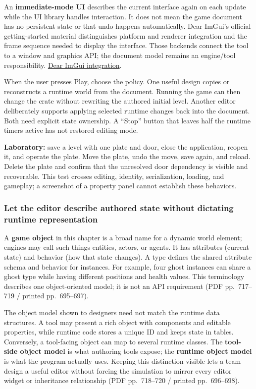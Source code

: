 An \textbf{immediate-mode UI} describes the current interface again on each update while the UI library handles interaction. It does not mean the game document has no persistent state or that undo happens automatically. Dear ImGui's official getting-started material distinguishes platform and renderer integration and the frame sequence needed to display the interface. Those backends connect the tool to a window and graphics API; the document model remains an engine/tool responsibility. \href{https://github.com/ocornut/imgui/wiki/Getting-Started}{Dear ImGui integration}.

When the user presses Play, choose the policy. One useful design copies or reconstructs a runtime world from the document. Running the game can then change the crate without rewriting the authored initial level. Another editor deliberately supports applying selected runtime changes back into the document. Both need explicit state ownership. A ``Stop'' button that leaves half the runtime timers active has not restored editing mode.

\textbf{Laboratory:} save a level with one plate and door, close the application, reopen it, and operate the plate. Move the plate, undo the move, save again, and reload. Delete the plate and confirm that the unresolved door dependency is visible and recoverable. This test crosses editing, identity, serialization, loading, and gameplay; a screenshot of a property panel cannot establish these behaviors.

\subsubsection{Let the editor describe authored state without dictating runtime representation}\label{06-engine-ii-ch032-let-the-editor-describe-authored-state-without-dictating-runtime-representation}

A \textbf{game object} in this chapter is a broad name for a dynamic world element; engines may call such things entities, actors, or agents. It has attributes (current state) and behavior (how that state changes). A type defines the shared attribute schema and behavior for instances. For example, four ghost instances can share a ghost type while having different positions and health values. This terminology describes one object-oriented model; it is not an API requirement (PDF pp.~717--719 / printed pp.~695--697).

The object model shown to designers need not match the runtime data structures. A tool may present a rich object with components and editable properties, while runtime code stores a unique ID and keeps state in tables. Conversely, a tool-facing object can map to several runtime classes. The \textbf{tool-side object model} is what authoring tools expose; the \textbf{runtime object model} is what the program actually uses. Keeping this distinction visible lets a team design a useful editor without forcing the simulation to mirror every editor widget or inheritance relationship (PDF pp.~718--720 / printed pp.~696--698).

